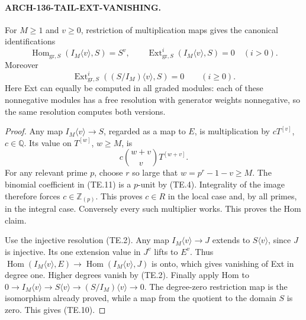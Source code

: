 \paragraph{ARCH-136-TAIL-EXT-VANISHING.}
For \(M\geq1\) and \(v\geq0\), restriction of multiplication
maps gives the canonical identifications
\[
 \operatorname{Hom}_{\mathrm{gr},S}(I_M\langle v\rangle,S)=S^v,
 \qquad
 \operatorname{Ext}^{i}_{\mathrm{gr},S}(I_M\langle v\rangle,S)=0
                         \quad(i>0).                    \tag{TE.9}
\]
Moreover
\[
 \operatorname{Ext}^{i}_{\mathrm{gr},S}
       ((S/I_M)\langle v\rangle,S)=0\qquad(i\geq0).      \tag{TE.10}
\]
Here Ext can equally be computed in all graded modules: each of
these nonnegative modules has a free resolution with generator
weights nonnegative, so the same resolution computes both versions.

\begin{proof}
Any map \(I_M\langle v\rangle\to S\), regarded as a map to
\(E\), is multiplication by \(cT^{[v]}\), \(c\in\mathbb Q\).
Its value on \(T^{[w]}\), \(w\geq M\), is
\[
                  c\binom{w+v}{v}T^{[w+v]}.             \tag{TE.11}
\]
For any relevant prime \(p\), choose \(r\) so large that
\(w=p^r-1-v\geq M\).  The binomial coefficient in (TE.11)
is a \(p\)-unit by (TE.4).  Integrality of the image therefore
forces \(c\in\mathbb Z_{(p)}\).  This proves \(c\in R\)
in the local case and, by all primes, in the integral case.
Conversely every such multiplier works.  This proves the Hom claim.

Use the injective resolution (TE.2).  Any map
\(I_M\langle v\rangle\to J\) extends to
\(S\langle v\rangle\), since \(J\) is injective.  Its one
extension value in \(J^v\) lifts to \(E^v\).  Thus
\(\operatorname{Hom}(I_M\langle v\rangle,E)\to
\operatorname{Hom}(I_M\langle v\rangle,J)\) is onto,
which gives vanishing of Ext in degree one.  Higher degrees vanish
by (TE.2).  Finally apply Hom to
\(0\to I_M\langle v\rangle\to S\langle v\rangle\to
(S/I_M)\langle v\rangle\to0\).  The degree-zero restriction
map is the isomorphism already proved, while a map from the quotient
to the domain \(S\) is zero.  This gives (TE.10).
\end{proof}


